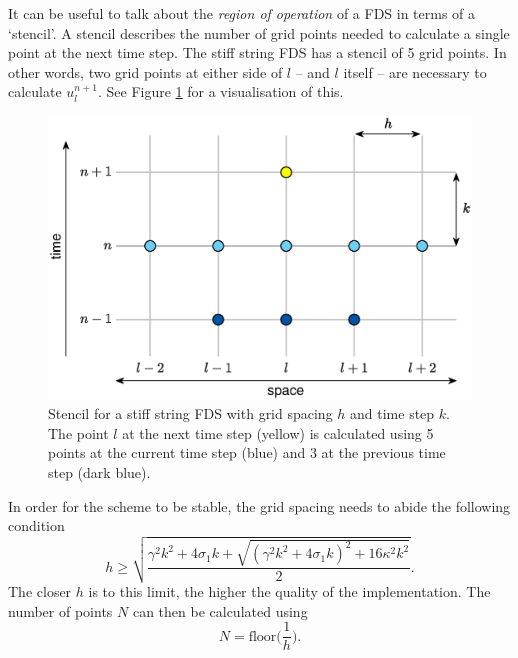 It can be useful to talk about the \textit{region of operation} of a FDS in terms of a `stencil'. A stencil describes the number of grid points needed to calculate a single point at the next time step. The stiff string FDS has a stencil of 5 grid points. In other words, two grid points at either side of $l$ -- and $l$ itself -- are necessary to calculate $u^{n+1}_l$. See Figure \ref{fig:stencil1D} for a visualisation of this.
\begin{figure}[ht]
    \centering
    \includegraphics[width=\paperFigWidth\textwidth]{figures/stencil1Dedit.eps}
\caption{Stencil for a stiff string FDS with grid spacing $h$ and time step $k$. The point $l$ at the next time step (yellow) is calculated using 5 points at the current time step (blue) and 3 at the previous time step (dark blue). \label{fig:stencil1D}}
\end{figure}

In order for the scheme to be stable, the grid spacing needs to abide the following condition \cite{Bilbao2009:NumericalSoundSynthesis}
\begin{equation}\label{eq:stabilityString}
    h \geq \sqrt{\frac{\gamma^2 k^2 + 4 \sigma_1 k + \sqrt {(\gamma^2 k^2 + 4 \sigma_1 k)^2 + 16 \kappa^2 k^2}}{2}}.
\end{equation}
The closer $h$ is to this limit, the higher the quality of the implementation. The number of points $N$ can then be calculated using 
\begin{equation}\label{eq:NString}
    N = \text{floor}\bigg(\frac{1}{h}\bigg).
\end{equation}

